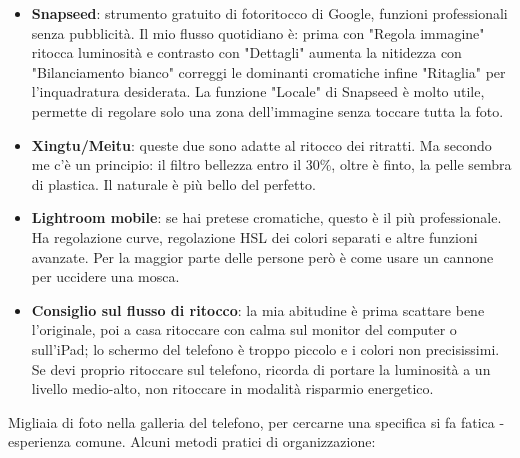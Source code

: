 \begin{itemize}
  \item \textbf{Snapseed}: strumento gratuito di fotoritocco di Google, funzioni professionali senza pubblicità. Il mio flusso quotidiano è: prima con "Regola immagine" ritocca luminosità e contrasto con "Dettagli" aumenta la nitidezza con "Bilanciamento bianco" correggi le dominanti cromatiche infine "Ritaglia" per l'inquadratura desiderata. La funzione "Locale" di Snapseed è molto utile, permette di regolare solo una zona dell'immagine senza toccare tutta la foto.
  \item \textbf{Xingtu/Meitu}: queste due sono adatte al ritocco dei ritratti. Ma secondo me c'è un principio: il filtro bellezza entro il 30\%, oltre è finto, la pelle sembra di plastica. Il naturale è più bello del perfetto.
  \item \textbf{Lightroom mobile}: se hai pretese cromatiche, questo è il più professionale. Ha regolazione curve, regolazione HSL dei colori separati e altre funzioni avanzate. Per la maggior parte delle persone però è come usare un cannone per uccidere una mosca.
  \item \textbf{Consiglio sul flusso di ritocco}: la mia abitudine è prima scattare bene l'originale, poi a casa ritoccare con calma sul monitor del computer o sull'iPad; lo schermo del telefono è troppo piccolo e i colori non precisissimi. Se devi proprio ritoccare sul telefono, ricorda di portare la luminosità a un livello medio-alto, non ritoccare in modalità risparmio energetico.
\end{itemize}


Migliaia di foto nella galleria del telefono, per cercarne una specifica si fa fatica - esperienza comune. Alcuni metodi pratici di organizzazione:

